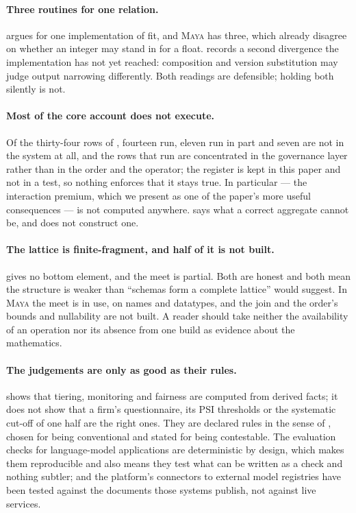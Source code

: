 \documentclass[11pt,a4paper]{article}
\renewcommand{\_}{\oldunderscore\allowbreak}
\theoremstyle{plain}
\theoremstyle{definition}
\theoremstyle{definition}
\theoremstyle{remark}
\begin{document}
\paragraph{Three routines for one relation.}  argues for one implementation of
fit, and \textsc{Maya} has three, which already disagree on whether an integer may stand in for a
float.  records a second divergence the implementation has not yet reached: composition and
version substitution may judge output narrowing differently. Both readings are defensible; holding both
silently is not.

\paragraph{Most of the core account does not execute.} Of the thirty-four rows of ,
fourteen run, eleven run in part and seven are not in the system at all, and the rows that run are
concentrated in the governance layer rather than in the order and the operator; the register is kept in this paper and not
in a test, so nothing enforces that it stays true. In particular  --- the interaction premium,
which we present as one of the paper's more useful consequences --- is not computed anywhere.
 says what a correct aggregate cannot be, and does not construct one.

\paragraph{The lattice is finite-fragment, and half of it is not built.}  gives no bottom
element, and the meet is partial. Both are honest and both mean the structure is weaker than ``schemas form a
complete lattice'' would suggest. In \textsc{Maya} the meet is in use, on names and datatypes, and the join and
the order's bounds and nullability are not built. A reader should take neither the availability of an
operation nor its absence from one build as evidence about the mathematics.

\paragraph{The judgements are only as good as their rules.}  shows that tiering,
monitoring and fairness are computed from derived facts; it does not show that a firm's questionnaire, its
PSI thresholds or the systematic cut-off of one half are the right ones. They are declared rules in the sense
of , chosen for being conventional and stated for being contestable. The evaluation
checks for language-model applications are deterministic by design, which makes them reproducible and also
means they test what can be written as a check and nothing subtler; and the platform's connectors to external
model registries have been tested against the documents those systems publish, not against live services.
\end{document}

